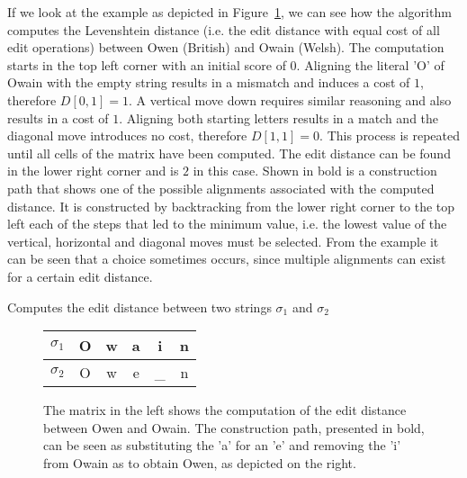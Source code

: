 If we look at the example as depicted in Figure~\ref{fig:edit_distance}, we can see how the algorithm computes the Levenshtein distance (i.e. the edit distance with equal cost of all edit operations) between Owen (British) and Owain (Welsh).
The computation starts in the top left corner with an initial score of $0$.
Aligning the literal 'O' of Owain with the empty string results in a mismatch and induces a cost of $1$, therefore $D[0, 1]=1$.
A vertical move down requires similar reasoning and also results in a cost of $1$.
Aligning both starting letters results in a match and the diagonal move introduces no cost, therefore $D[1, 1]=0$.
This process is repeated until all cells of the matrix have been computed.
The edit distance can be found in the lower right corner and is $2$ in this case.
Shown in bold is a construction path that shows one of the possible alignments associated with the computed distance.
It is constructed by backtracking from the lower right corner to the top left each of the steps that led to the minimum value, i.e. the lowest value of the vertical, horizontal and diagonal moves must be selected.
From the example it can be seen that a choice sometimes occurs, since multiple alignments can exist for a certain edit distance.

\begin{algorithm}
    
    \caption{Computes the edit distance between two strings $\sigma_1$ and $\sigma_2$}
    \label{alg:edit_distance}
\end{algorithm}

\begin{figure}
    \centering
    \begin{minipage}{.65\textwidth}
        \centering
        
    \end{minipage}%
    \begin{minipage}{.35\textwidth}
        \centering
        \begin{tabular}{c||c|c|c|c|c}
            $\sigma_1$ & O & w & a & i & n \\\hline
            $\sigma_2$ & O & w & e & \_ & n
        \end{tabular}
    \end{minipage}
    \caption{The matrix in the left shows the computation of the edit distance between Owen and Owain. The construction path, presented in bold, can be seen as substituting the 'a' for an 'e' and removing the 'i' from Owain as to obtain Owen, as depicted on the right.}
    \label{fig:edit_distance}
\end{figure}


